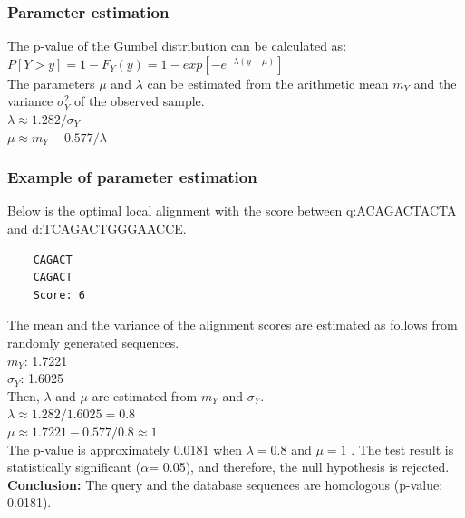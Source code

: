 %
%
\subsubsection*{Parameter estimation}
The p-value of the Gumbel distribution can be calculated as: \\

$P[Y>y]=1-F_Y (y)=1-exp⁡[-e^{-\lambda(y-\mu)}]$ \\

\noindent
The parameters $\mu$ and $\lambda$ can be estimated from the arithmetic mean $m_{Y}$ and the variance $\sigma_{Y}^2$ of the observed sample. \\

$\lambda \approx 1.282 / \sigma_{Y}$ \\

$\mu \approx m_{Y} - 0.577/\lambda$

%
%
\subsubsection*{Example of parameter estimation}
Below is the optimal local alignment with the score between q:ACAGACTACTA and  d:TCAGACTGGGAACCE.

\begin{verbatim}
    CAGACT
    CAGACT
    Score: 6
\end{verbatim}

\noindent
The mean and the variance of the alignment scores are estimated as follows from randomly generated sequences. \\

$m_{Y}$: 1.7221 \\

$\sigma_{Y}$: 1.6025 \\

\noindent
Then, $\lambda$ and $\mu$ are estimated from $m_{Y}$ and $\sigma_{Y}$. \\

$\lambda \approx 1.282 / 1.6025 = 0.8$ \\

$\mu \approx 1.7221- 0.577/0.8 \approx 1$  \\

\noindent
The p-value is approximately 0.0181 when $\lambda = 0.8$ and $\mu = 1$ . The test result is statistically significant ($\alpha$= 0.05), and therefore, the null hypothesis is rejected. \\

\noindent
\textbf{Conclusion:} The query and the database sequences are homologous (p-value: 0.0181).

\bigskip 

%
